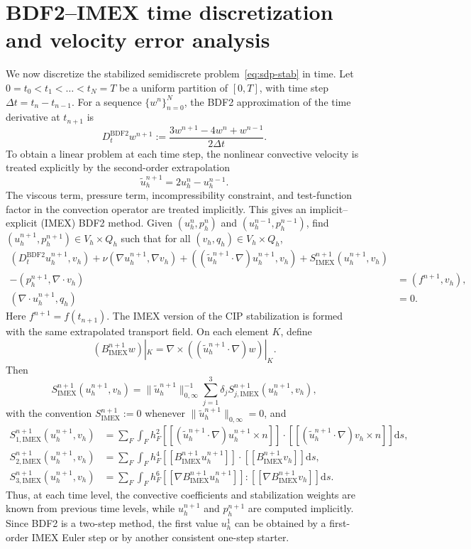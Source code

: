\documentclass[11pt]{article}
\theoremstyle{remark}\newtheorem{remark}{Remark}
\newcommand{\dd}{\mathrm{d}}
\newcommand{\Vh}{V_h}\newcommand{\Qh}{Q_h}
\newcommand{\Dt}{D_t^{\mathrm{BDF2}}}
\newcommand{\tu}{\tilde u_h}
\newcommand{\Simex}{S_{\mathrm{IMEX}}}
\theoremstyle{plain}
\newcommand{\new}[1]{{\color{blue}#1}}
\begin{document}
\section{BDF2--IMEX time discretization\new{ and velocity error analysis}}\label{sec:bdf2}
We now discretize the stabilized semidiscrete problem~\eqref{eq:sdp-stab} in time. Let $0=t_0<t_1<\dots<t_N=T$ be a uniform partition of $[0,T]$, with time step $\Delta t=t_n-t_{n-1}$. For a sequence $\{w^n\}_{n=0}^N$, the BDF2 approximation of the time derivative at $t_{n+1}$ is
\[
    \Dt w^{n+1}
    :=\frac{3w^{n+1}-4w^n+w^{n-1}}{2\Delta t}.
\]
To obtain a linear problem at each time step, the nonlinear convective velocity is treated explicitly by the second-order extrapolation
\[
    \tu^{n+1}=2u_h^n-u_h^{n-1}.
\]
The viscous term, pressure term, incompressibility constraint, and 
test-function factor in the convection operator are treated implicitly. This 
gives an implicit--explicit (IMEX) BDF2 method. Given $(u_h^n,p_h^n)$ and 
$(u_h^{n-1},p_h^{n-1})$, find $(u_h^{n+1},p_h^{n+1})\in\Vh\times\Qh$ such that 
for all $(v_h,q_h)\in\Vh\times\Qh$,
\begin{equation}\label{eq:fully-discrete-scheme}
\begin{aligned}
(\Dt u_h^{n+1},v_h)+\nu(\nabla u_h^{n+1},\nabla v_h)+((\tu^{n+1}\cdot\nabla)u_h^{n+1},v_h)+\Simex^{n+1}(u_h^{n+1},v_h)&\\
-(p_h^{n+1},\nabla\cdot v_h)&=(f^{n+1},v_h),\\
(\nabla\cdot u_h^{n+1},q_h)&=0.
\end{aligned}
\end{equation}
Here $f^{n+1}=f(t_{n+1})$. The IMEX version of the CIP stabilization is formed with the same extrapolated transport field. On each element $K$, define
\[(B^{n+1}_{\mathrm{IMEX}}w)|_K=\nabla\times((\tu^{n+1}\cdot\nabla)w)|_K.\]
Then
\[\Simex^{n+1}(u_h^{n+1},v_h)=\|\tu^{n+1}\|_{0,\infty}^{-1}\sum_{j=1}^3\delta_jS^{n+1}_{j,\mathrm{IMEX}}(u_h^{n+1},v_h),\]
with the convention $\Simex^{n+1}:=0$ whenever $\|\tu^{n+1}\|_{0,\infty}=0$, and
\begin{align*}
S^{n+1}_{1,\mathrm{IMEX}}(u_h^{n+1},v_h)&=\sum_{F}\int_F h_F^2[\![(\tu^{n+1}\cdot\nabla)u_h^{n+1}\times n]\!]\cdot[\![(\tu^{n+1}\cdot\nabla)v_h\times n]\!]\dd s,\\
S^{n+1}_{2,\mathrm{IMEX}}(u_h^{n+1},v_h)&=\sum_{F}\int_F h_F^4[\![B^{n+1}_{\mathrm{IMEX}}u_h^{n+1}]\!]\cdot[\![B^{n+1}_{\mathrm{IMEX}}v_h]\!]\dd s,\\
S^{n+1}_{3,\mathrm{IMEX}}(u_h^{n+1},v_h)&=\sum_{F}\int_F h_F^6[\![\nabla B^{n+1}_{\mathrm{IMEX}}u_h^{n+1}]\!]:[\![\nabla B^{n+1}_{\mathrm{IMEX}}v_h]\!]\dd s.
\end{align*}
Thus, at each time level, the convective coefficients and stabilization weights 
are known from previous time levels, while $u_h^{n+1}$ and $p_h^{n+1}$ are 
computed implicitly. Since BDF2 is a two-step method, the first value $u_h^1$ 
can be obtained by a first-order IMEX Euler step or by another consistent 
one-step starter.
\end{document}
